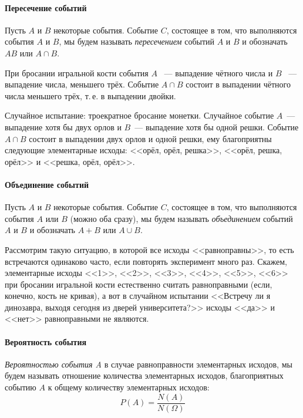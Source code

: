 \documentclass[11pt]{article}
\begin{document}
\paragraph{Пересечение событий} Пусть $A$ и $B$ некоторые события. Событие $C$, состоящее в том, что выполняются события $A$ и $B$, мы будем называть \emph{пересечением} событий $A$ и $B$ и обозначать $AB$ или $A\cap B$.

\begin{examples}
	\item При бросании игральной кости события $A$ ~--- выпадение чётного числа и $B$ ~--- выпадение числа, меньшего трёх. Событие $A\cap B$ состоит в выпадении чётного числа меньшего трёх, т.\,е. в выпадении двойки.

	\item Случайное испытание: троекратное бросание монетки. Случайное событие $A$~--- выпадение хотя бы двух орлов и $B$~--- выпадение хотя бы одной решки. Событие $A\cap B$ состоит в выпадении двух орлов и одной решки, ему благоприятны следующие элементарные исходы: <<орёл, орёл, решка>>, <<орёл, решка, орёл>> и <<решка, орёл, орёл>>.
\end{examples}

\paragraph{Объединение событий} Пусть $A$ и $B$ некоторые события. Событие $C$, состоящее в том, что выполняются события $A$ или $B$ (можно оба сразу), мы будем называть \emph{объединением} событий $A$ и $B$ и обозначать $A+B$ или $A\cup B$.

Рассмотрим такую ситуацию, в которой все исходы <<равноправны>>, то есть встречаются одинаково часто, если повторять эксперимент много раз. Скажем, элементарные исходы <<1>>, <<2>>, <<3>>, <<4>>, <<5>>, <<6>> при бросании игральной кости естественно считать равноправными (если, конечно, кость не кривая), а вот в случайном испытании <<Встречу ли я динозавра, выходя сегодня из дверей университета?>> исходы <<да>> и <<нет>> равноправными не являются.

\paragraph{Вероятность события} \emph{Вероятностью события A} в случае равноправности элементарных исходов, мы будем называть отношение количества элементарных исходов, благоприятных событию $A$ к общему количеству элементарных исходов:
$$
	P(A)=\frac{N(A)}{N(\Omega)}
$$
\end{document}

